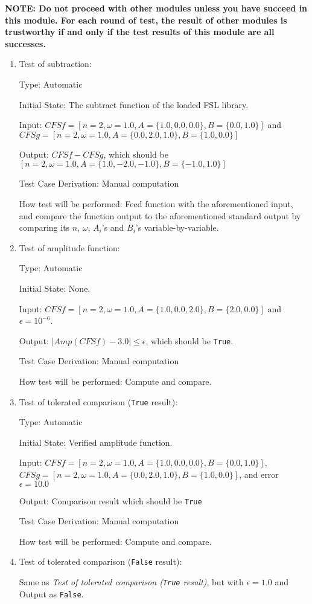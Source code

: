 \documentclass[12pt, titlepage]{article}
\newcommand{\li}[1]{\texttt{#1}}
\begin{document}
\textbf{NOTE: Do not proceed with other modules unless you have succeed in this module. For each round of test, the result of other modules is trustworthy if and only if the test results of this module are all successes.}

\begin{enumerate}
	
	\item{Test of subtraction: \\}
	
	Type: Automatic
	
	Initial State: The subtract function of the loaded FSL library.
	
	Input: $\mathit{CFSf}=[n=2, \omega=1.0, A=\{1.0, 0.0, 0.0\}, B=\{0.0, 1.0\}]$ and 
	$\mathit{CFSg}=[n=2, \omega=1.0, A=\{0.0, 2.0, 1.0\}, B=\{1.0, 0.0\}]$	 
	
	Output: $\mathit{CFSf}-\mathit{CFSg}$, which should be $[n=2, \omega=1.0, A=\{1.0, -2.0, -1.0\}, B=\{-1.0, 1.0\}]$
	
	Test Case Derivation: Manual computation
	
	How test will be performed: Feed function with the aforementioned input, and compare the function output to the aforementioned standard output by comparing its $n$, $\omega$, $A_i$'s and $B_i$'s variable-by-variable.
	
	\item{Test of amplitude function: \\}					
	
	Type: Automatic
	
	Initial State: None.
	
	Input: $\mathit{CFSf}=[n=2, \omega=1.0, A=\{1.0, 0.0, 2.0\}, B=\{2.0, 0.0\}]$ and $\epsilon=10^{-6}$.
	
	Output: $|\mathit{Amp}(\mathit{CFSf})-3.0|\leq\epsilon$, which should be \li{True}.
	
	Test Case Derivation: Manual computation
	
	How test will be performed: Compute and compare.
	
	
	\item{Test of tolerated comparison  (\li{True} result): \\}
	
	Type: Automatic
	
	Initial State: Verified amplitude function.
	
	Input: $\mathit{CFSf}=[n=2, \omega=1.0, A=\{1.0, 0.0, 0.0\}, B=\{0.0, 1.0\}]$, 
	$\mathit{CFSg}=[n=2, \omega=1.0, A=\{0.0, 2.0, 1.0\}, B=\{1.0, 0.0\}]$, and error $\epsilon=10.0$
	
	Output: Comparison result which should be \li{True}
	
	Test Case Derivation: Manual computation
	
	How test will be performed: Compute and compare.
	
	\item{Test of tolerated comparison  (\li{False} result):\\}
	
	Same as \textit{Test of tolerated comparison  (\li{True} result)}, but with $\epsilon=1.0$ and Output as \li{False}.    
\end{enumerate}
\end{document}
